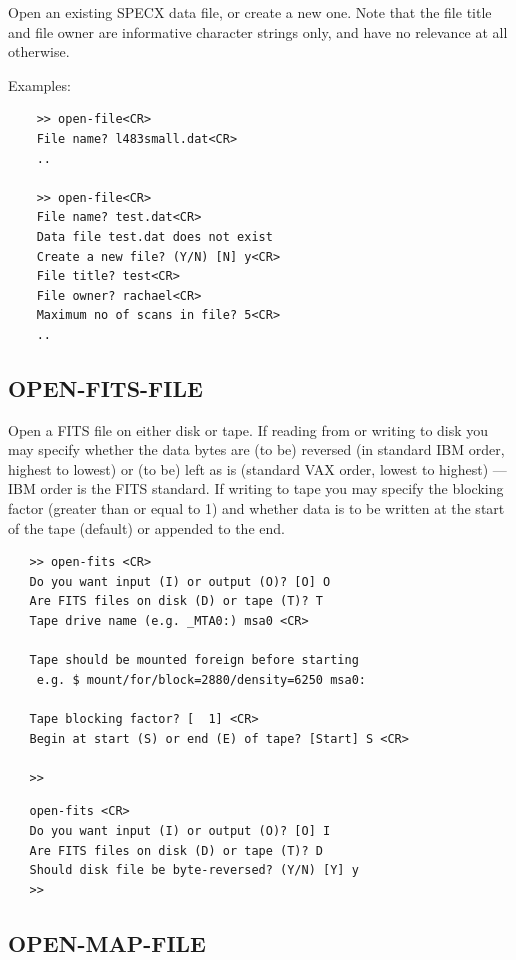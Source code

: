 \documentclass[11pt,twoside]{report}
\begin{document}
Open an existing SPECX data file, or create a new one. Note that the
file title and file owner are informative character strings only, and
have no relevance at all otherwise.

Examples:
\begin{verbatim}
    >> open-file<CR>
    File name? l483small.dat<CR>
    ..

    >> open-file<CR>
    File name? test.dat<CR>
    Data file test.dat does not exist
    Create a new file? (Y/N) [N] y<CR>
    File title? test<CR>
    File owner? rachael<CR>
    Maximum no of scans in file? 5<CR>
    ..
\end{verbatim}

\subsection{OPEN-FITS-FILE} 

Open a FITS file on either disk or tape. If reading from or writing to disk you may
specify whether the data bytes are (to be) reversed (\ie in standard
IBM order, highest to lowest) or (to be) left as is (\ie standard VAX order,
lowest to highest) --- IBM order is the FITS standard. If writing to tape
you may specify the blocking factor (greater than or equal to 1) and whether
data is to be written at the start of the tape (default) or appended to the
end.

\begin{verbatim}
   >> open-fits <CR>
   Do you want input (I) or output (O)? [O] O
   Are FITS files on disk (D) or tape (T)? T
   Tape drive name (e.g. _MTA0:) msa0 <CR>
 
   Tape should be mounted foreign before starting
    e.g. $ mount/for/block=2880/density=6250 msa0:
 
   Tape blocking factor? [  1] <CR>
   Begin at start (S) or end (E) of tape? [Start] S <CR>

   >> 
\end{verbatim}

\begin{verbatim}
   open-fits <CR>
   Do you want input (I) or output (O)? [O] I
   Are FITS files on disk (D) or tape (T)? D
   Should disk file be byte-reversed? (Y/N) [Y] y
   >> 
\end{verbatim}

\subsection{OPEN-MAP-FILE} 
\end{document}

